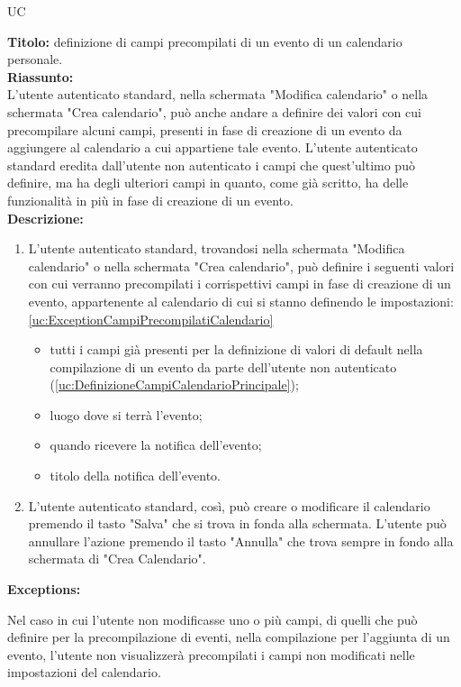 \begin{listaPersonale}{UC}
\begin{listaPersonale2}[UC] {}
            \textbf{Titolo: } definizione di campi precompilati di un evento di un calendario personale. \\
            \textbf{Riassunto: } \\ L'utente autenticato standard, nella schermata "Modifica calendario" o nella schermata "Crea calendario", può anche andare a definire dei valori con cui precompilare alcuni campi, presenti in fase di creazione di un evento da aggiungere al calendario a cui appartiene tale evento. L'utente autenticato standard eredita dall'utente non autenticato i campi che quest'ultimo può definire, ma ha degli ulteriori campi in quanto, come già scritto, ha delle funzionalità in più in fase di creazione di un evento. \\
            \textbf{Descrizione: }
            \begin {enumerate}
        \item L'utente autenticato standard, trovandosi nella schermata "Modifica calendario" o nella schermata "Crea calendario", può definire i seguenti valori con cui verranno precompilati i corrispettivi campi in fase di creazione di un evento, appartenente al calendario di cui si stanno definendo le impostazioni: \ref{uc:ExceptionCampiPrecompilatiCalendario}
              \begin{itemize}
                  \item tutti i campi già presenti per la definizione di valori di default nella compilazione di un evento da parte dell'utente non autenticato (\ref{uc:DefinizioneCampiCalendarioPrincipale});
                  \item luogo dove si terrà l'evento;
                  \item quando ricevere la notifica dell'evento;
                  \item titolo della notifica dell'evento.
              \end{itemize}
        \item L'utente autenticato standard, così, può creare o modificare il calendario premendo il tasto "Salva" che si trova in fonda alla schermata. L'utente può annullare l'azione premendo il tasto "Annulla" che trova sempre in fondo alla schermata di "Crea Calendario".
              \end{enumerate}
              \textbf{Exceptions:}
              \begin{enumerate}[label=\textbf{[exception \arabic{enumiii}]}, ref= \textbf{[exception \arabic{enumiii}]}]
                   Nel caso in cui l'utente non modificasse uno o più campi, di quelli che può definire per la precompilazione di eventi, nella compilazione per l'aggiunta di un evento, l'utente non visualizzerà precompilati i campi non modificati nelle impostazioni del calendario.
              \end{enumerate}



\end{listaPersonale2}
\end{listaPersonale}
